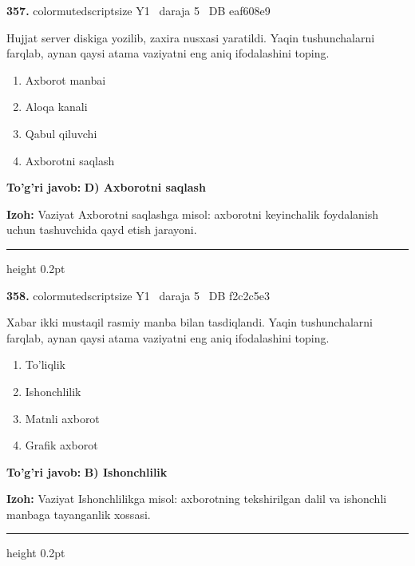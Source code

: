 \documentclass[10pt,a4paper,oneside]{article}
\begin{document}
\noindent\textbf{\color{ink}357.}  {color{muted}scriptsize Y1 \textbullet\ daraja 5 \textbullet\ DB eaf608e9}
\par
Hujjat server diskiga yozilib, zaxira nusxasi yaratildi. Yaqin tushunchalarni farqlab, aynan qaysi atama vaziyatni eng aniq ifodalashini toping.
\begin{enumerate}[label=\Alph*),leftmargin=9mm]
\item Axborot manbai
\item Aloqa kanali
\item Qabul qiluvchi
\item Axborotni saqlash
\end{enumerate}
\begin{tcolorbox}[enhanced,breakable,colback=teal!4,colframe=teal!50!black,boxrule=0.5pt,arc=1.1mm,left=3mm,right=3mm,top=1.7mm,bottom=1.7mm,before skip=2mm,after skip=2mm]
\textbf{\color{teal}To'g'ri javob:} \textbf{D) Axborotni saqlash}
\par\smallskip
\textbf{Izoh:} Vaziyat Axborotni saqlashga misol: axborotni keyinchalik foydalanish uchun tashuvchida qayd etish jarayoni.
\end{tcolorbox}
\vspace{2mm}\hrule height 0.2pt \vspace{3mm}

\noindent\textbf{\color{ink}358.}  {color{muted}scriptsize Y1 \textbullet\ daraja 5 \textbullet\ DB f2c2c5e3}
\par
Xabar ikki mustaqil rasmiy manba bilan tasdiqlandi. Yaqin tushunchalarni farqlab, aynan qaysi atama vaziyatni eng aniq ifodalashini toping.
\begin{enumerate}[label=\Alph*),leftmargin=9mm]
\item To'liqlik
\item Ishonchlilik
\item Matnli axborot
\item Grafik axborot
\end{enumerate}
\begin{tcolorbox}[enhanced,breakable,colback=teal!4,colframe=teal!50!black,boxrule=0.5pt,arc=1.1mm,left=3mm,right=3mm,top=1.7mm,bottom=1.7mm,before skip=2mm,after skip=2mm]
\textbf{\color{teal}To'g'ri javob:} \textbf{B) Ishonchlilik}
\par\smallskip
\textbf{Izoh:} Vaziyat Ishonchlilikga misol: axborotning tekshirilgan dalil va ishonchli manbaga tayanganlik xossasi.
\end{tcolorbox}
\vspace{2mm}\hrule height 0.2pt \vspace{3mm}
\end{document}
